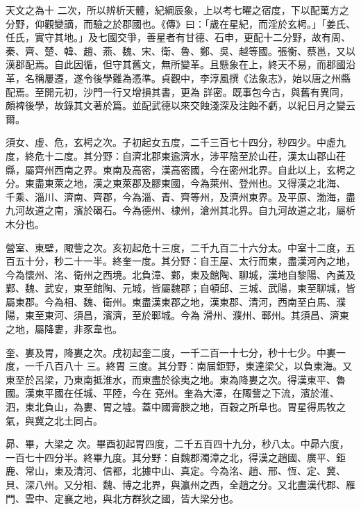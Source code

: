 
\begin{pinyinscope}

 天文之為十
 二次，所以辨析天體，紀綱辰象，上以考七曜之宿度，下以配萬方之分野，仰觀變謫，而驗之於郡國也。《傳》曰：「歲在星紀，而淫於玄枵。」「姜氏、任氏，實守其地。」及七國交爭，善星者有甘德、石申，更配十二分野，故有周、秦、齊、楚、韓、趙、燕、魏、宋、衛、魯、鄭、吳、越等國。張衡、蔡邕，又以漢郡配焉。自此因循，但守其舊文，無所變革。且懸象在上，終天不易，而郡國沿革，名稱屢遷，遂令後學難為憑準。貞觀中，李淳風撰《法象志》，始以唐之州縣配焉。至開元初，沙門一行又增損其書，更為
 詳密。既事包今古，與舊有異同，頗裨後學，故錄其文著於篇。並配武德以來交蝕淺深及注蝕不虧，以紀日月之變云爾。



 須女、虛、危，玄枵之次。子初起女五度，二千三百七十四分，秒四少。中虛九度，終危十二度。其分野：自濟北郡東逾濟水，涉平陰至於山茌，漢太山郡山茌縣，屬齊州西南之界。東南及高密，漢高密國，今在密州北界。自此以上，玄枵之分。東盡東萊之地，漢之東萊郡及膠東國，今為萊州、登州也。又得漢之北海、
 千乘、淄川、濟南、齊郡，今為淄、青、齊等州，及濟州東界。及平原、渤海，盡九河故道之南，濱於碣石。今為德州、棣州，滄州其北界。自九河故道之北，屬析木分也。



 營室、東壁，陬訾之次。亥初起危十三度，二千九百二十六分太。中室十二度，五百五十分，秒二十一半。終奎一度。其分野：自王屋、太行而東，盡漢河內之地，今為懷州、洺、衛州之西境。北負漳、鄴，東及館陶、聊城，漢地自黎陽、內黃及鄴、魏、武安，東至館陶、元城，皆屬魏郡；自頓邱、三城、武陽，東至聊城，皆屬東郡。今為相、魏、衛州。東盡漢東郡之地，漢東郡、清河，西南至白馬、濮陽，東至東河、須昌，濱濟，至於鄆城。今為
 滑州、濮州、鄆州。其須昌、濟東之地，屬降婁，非豕韋也。



 奎、婁及胃，降婁之次。戌初起奎二度，一千二百一十七分，秒十七少。中婁一度，一千八百八十
 三。終胃
 三度。其分野：南屆鉅野，東達梁父，以負東海。又東至於呂梁，乃東南抵淮水，而東盡於徐夷之地。東為降婁之次。得漢東平、魯國。漢東平國在任城、平陸，今在
 兗州。奎為大澤，在陬訾之下流，濱於淮、泗，東北負山，為婁、胃之墟。蓋中國膏腴之地，百穀之所阜也。胃星得馬牧之氣，與冀之北土同占。



 昴、畢，大梁之
 次。畢酉初起胃四度，二千五百四十九分，秒八太。中昴六度，一百七十四分半。終畢九度。其分野：自魏郡濁漳之北，得漢之趙國、廣平、鉅鹿、常山，東及清河、信都，北據中山、真定。今為洺、趙、邢、恆、定、冀、貝、深八州。又分相、魏、博之北界，與瀛州之西，全趙之分。又北盡漢代郡、雁門、雲中、定襄之地，與北方群狄之國，皆大梁分也。




\end{pinyinscope}
